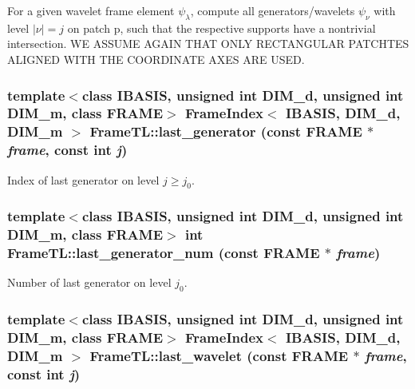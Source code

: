 For a given wavelet frame element $\psi_\lambda$, compute all generators/wavelets $\psi_\nu$ with level $|\nu|=j$ on patch p, such that the respective supports have a nontrivial intersection. WE ASSUME AGAIN THAT ONLY RECTANGULAR PATCHTES ALIGNED WITH THE COORDINATE AXES ARE USED. \hypertarget{namespaceFrameTL_a6650ac9337756c12f5022699c50cc28}{
\subsubsection[last\_\-generator]{\setlength{\rightskip}{0pt plus 5cm}template$<$class IBASIS, unsigned int DIM\_\-d, unsigned int DIM\_\-m, class FRAME$>$ {\bf FrameIndex}$<$ IBASIS, DIM\_\-d, DIM\_\-m $>$ FrameTL::last\_\-generator (const FRAME $\ast$ {\em frame}, \/  const int {\em j})}}
\label{namespaceFrameTL_a6650ac9337756c12f5022699c50cc28}


Index of last generator on level $j \geq j_0$. \hypertarget{namespaceFrameTL_0544af1a279910dc8bcdb9b542df3166}{
\subsubsection[last\_\-generator\_\-num]{\setlength{\rightskip}{0pt plus 5cm}template$<$class IBASIS, unsigned int DIM\_\-d, unsigned int DIM\_\-m, class FRAME$>$ int FrameTL::last\_\-generator\_\-num (const FRAME $\ast$ {\em frame})}}
\label{namespaceFrameTL_0544af1a279910dc8bcdb9b542df3166}


Number of last generator on level $j_0$. \hypertarget{namespaceFrameTL_7c29f890e91e2cd966b9ac6b773277cf}{
\subsubsection[last\_\-wavelet]{\setlength{\rightskip}{0pt plus 5cm}template$<$class IBASIS, unsigned int DIM\_\-d, unsigned int DIM\_\-m, class FRAME$>$ {\bf FrameIndex}$<$ IBASIS, DIM\_\-d, DIM\_\-m $>$ FrameTL::last\_\-wavelet (const FRAME $\ast$ {\em frame}, \/  const int {\em j})}}
\label{namespaceFrameTL_7c29f890e91e2cd966b9ac6b773277cf}


